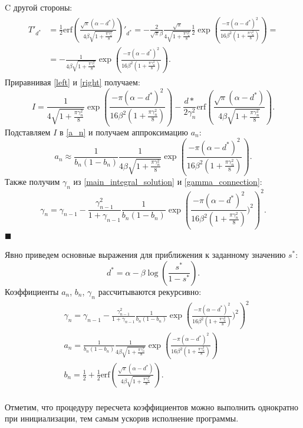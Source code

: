 C другой стороны:
\begin{multline}
    \label{right}
    \begin{aligned}
        T'_{d^*} &= \frac{1}{2} \text{erf}\left(\frac{\sqrt{\pi} (\alpha-d^*)}{4  \beta \sqrt{1+\frac{\pi\gamma_n^2}{8}}} \right)'_{d^*} = - \frac{2}{\sqrt{\pi} \beta} \frac{\sqrt{\pi}}{4 \sqrt{1+\frac{\pi\gamma_n^2}{8}}}
        \frac{1}{2} \exp\left( \frac{- \pi (\alpha-d^*)^2}{16  \beta^2 ( 1+\frac{\pi\gamma_n^2}{8})}\right) =\\
        &= - \frac{1}{4  \beta \sqrt{1+\frac{\pi\gamma_n^2}{8}}}
        \exp\left( \frac{- \pi (\alpha-d^*)^2}{16  \beta^2( 1+\frac{\pi\gamma_n^2}{8})}\right).
    \end{aligned}
\end{multline}
Приравнивая \ref{left} и \ref{right} получаем:
\begin{equation}
    \label{main_integral_solution}
    I= \frac{1}{4 \sqrt{1+\frac{\pi\gamma_n^2}{8}}} \exp\left( \frac{- \pi (\alpha-d^*)^2}{16 \beta^2 ( 1+\frac{\pi\gamma_n^2}{8})}\right) - \frac{d*}{2 \gamma_n^2} \text{erf}\left(\frac{\sqrt{\pi} (\alpha-d^*)}{4 \beta\sqrt{1+\frac{\pi\gamma_n^2}{8}}} \right).   
\end{equation}
Подставляем $I$ в \ref{a_n} и получаем аппроксимацию ${a_n}$:
\begin{equation}
     a_n \approx \frac{1}{b_n(1-b_n)} \frac{1}{4  \beta \sqrt{1+\frac{\pi\gamma_n^2}{8}}} \exp\left( \frac{- \pi (\alpha-d^*)^2}{16  \beta^2 ( 1+\frac{\pi\gamma_n^2}{8})}\right).
\end{equation}
Также получим $\gamma_n$ из \ref{main_integral_solution} и \ref{gamma_connection}: 
\begin{equation}
    \gamma_n = \gamma_{n-1} - \frac{\gamma_{n-1}^2}{1+\gamma_{n-1}} \frac{1}{b_n(1-b_n)}
    \exp\left(\frac{- \pi (\alpha-d^*)^2}{16  \beta^2 ( 1+\frac{\pi\gamma_n^2}{8})})^2\right)^2.
\end{equation}
$\blacksquare$

Явно приведем основные выражения для приближения к заданному значению $s^*$:
    \begin{equation}
        d^* = \alpha  - \beta \log\left(\frac{s^*}{1-s^*}\right).
    \end{equation} Коэффициенты $a_n$, $b_n$, $\gamma_n$ рассчитываются рекурсивно:
    \begin{equation}
        \begin{aligned}
            &\gamma_n = \gamma_{n-1} - \frac{\gamma_{n-1}^2}{1+\gamma_{n-1}} \frac{1}{b_n(1-b_n)}
        \exp\left(\frac{- \pi (\alpha-d^*)^2}{16  \beta^2 ( 1+\frac{\pi\gamma_n^2}{8})})^2\right)^2 \\
            &a_n = \frac{1}{b_n(1-b_n)} \frac{1}{4  \beta \sqrt{1+\frac{\pi\gamma_n^2}{8}}} \exp\left( \frac{- \pi (\alpha-d^*)^2}{16  \beta^2 ( 1+\frac{\pi\gamma_n^2}{8})}\right)  \\
            &b_n = \frac{1}{2} + \frac{1}{2} \text{erf}\left(\frac{\sqrt{\pi} (\alpha-d^*)}{4 \beta \sqrt{1+\frac{\pi\gamma_n^2}{8}}} \right).\\  
        \end{aligned}
    \end{equation}

Отметим, что процедуру пересчета коэффициентов можно выполнить однократно при инициализации, тем самым ускорив исполнение программы.

